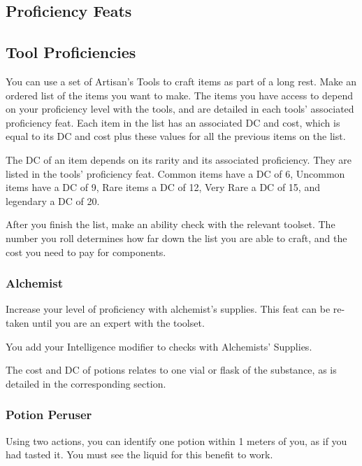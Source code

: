 \subsection*{Proficiency Feats}

\subsection*{Tool Proficiencies}
    You can use a set of Artisan's Tools to craft items as part of a long rest.
    Make an ordered list of the items you want to make.
    The items you have access to depend on your proficiency level with the tools, and are detailed in each tools' associated proficiency feat.
    Each item in the list has an associated DC and cost, which is equal to its DC and cost plus these values for all the previous items on the list.

    The DC of an item depends on its rarity and its associated proficiency.
    They are listed in the tools' proficiency feat.
    Common items have a DC of 6, Uncommon items have a DC of 9, Rare items a DC of 12, Very Rare a DC of 15, and legendary a DC of 20.

    After you finish the list, make an ability check with the relevant toolset.
    The number you roll determines how far down the list you are able to craft, and the cost you need to pay for components.

\subsubsection{Alchemist} \label{feat::alchemist}
    Increase your level of proficiency with alchemist's supplies.
    This feat can be re-taken until you are an expert with the toolset.

    You add your Intelligence modifier to checks with Alchemists' Supplies.

    The cost and DC of potions relates to one vial or flask of the substance, as is detailed in the corresponding section.
\subsubsection{Potion Peruser} \label{feat::potionperuser}
    Using two actions, you can identify one potion within 1 meters of you, as if you had tasted it.
    You must see the liquid for this benefit to work.

